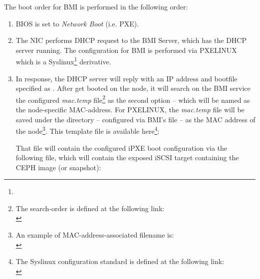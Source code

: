 The boot order for BMI is performed in the following order: \\
\begin{enumerate}
  \item BIOS is set to \emph{Network Boot} (i.e. PXE). \vspace{3mm}
  \item The NIC performs DHCP request to the BMI Server, which has the DHCP server running.  The configuration for BMI is performed via PXELINUX which is a Syslinux\footnote{} derivative. \vspace{3mm}
  \item In response, the DHCP server will reply with an IP address and bootfile specified as .  After  get booted on the node, it will search on the BMI service the configured \emph{mac.temp} file\footnote{\text{}\hspace{1mm}The search-order is defined at the following link: \\ \text{}\hspace{7mm}} as the second option -- which will be named as the node-specific MAC-address.  For PXELINUX, the \emph{mac.temp} file will be saved under the  directory -- configured via BMI's  file -- as the MAC address of the node\footnote{\text{}\hspace{1mm}An example of MAC-address-associated filename is:\\ \text{}\hspace{8mm}}.  This template file is available here\footnote{\text{}\hspace{1mm}The Syslinux configuration standard is defined at the following link:\\
\text{}\hspace{7mm}}:  

\begin{center}  
\end{center}  

That file will contain the configured iPXE boot configuration via the following file, which will contain the exposed iSCSI target containing the CEPH image (or snapshot):

\begin{center}  
\end{center}  


\end{enumerate}
